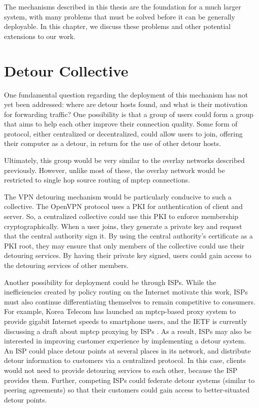 \documentclass{cwru}
\begin{document}
The mechanisms described in this thesis are the foundation for a much larger
system, with many problems that must be solved before it can be generally
deployable. In this chapter, we discuss these problems and other potential
extensions to our work.

\section{Detour Collective}

One fundamental question regarding the deployment of this mechanism has not yet
been addressed: where are detour hosts found, and what is their motivation for
forwarding traffic? One possibility is that a group of users could form a group
that aims to help each other improve their connection quality. Some form of
protocol, either centralized or decentralized, could allow users to join,
offering their computer as a detour, in return for the use of other detour
hosts.

Ultimately, this group would be very similar to the overlay networks described
previously. However, unlike most of these, the overlay network would be
restricted to single hop source routing of \ac{mptcp} connections.

The VPN detouring mechanism would be particularly conducive to such a
collective. The OpenVPN protocol uses a PKI for authentication of client and
server. So, a centralized collective could use this PKI to enforce membership
cryptographically. When a user joins, they generate a private key and request
that the central authority sign it. By using the central authority's certificate
as a PKI root, they may ensure that only members of the collective could use
their detouring services. By having their private key signed, users could gain
access to the detouring services of other members.

Another possibility for deployment could be through ISPs. While the
inefficiencies created by policy routing on the Internet motivate this work,
ISPs must also continue differentiating themselves to remain competitive to
consumers. For example, Korea Telecom has launched an \ac{mptcp}-based proxy
system to provide gigabit Internet speeds to smartphone users, and the IETF is
currently discussing a draft about \ac{mptcp} proxying by ISPs
\cite{boucadair-mptcp-plain-mode-10}. As a result, ISPs may also be interested
in improving customer experience by implementing a detour system. An ISP could
place detour points at several places in its network, and distribute detour
information to customers via a centralized protocol. In this case, clients would
not need to provide detouring services to each other, because the ISP provides
them. Further, competing ISPs could federate detour systems (similar to peering
agreements) so that their customers could gain access to better-situated detour
points.
\end{document}
